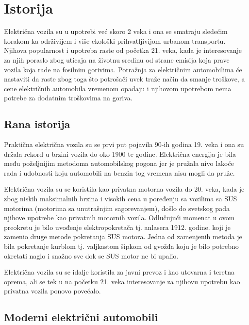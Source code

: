 \documentclass[a4paper]{article}
\begin{document}
\section{Istorija}
\label{sec:naslov1}


Električna vozila su u upotrebi već skoro 2 veka i ona se smatraju sledećim korakom ka održivijem i više ekološki prihvatljivijom urbanom transportu. Njihova popularnost i upotreba raste od početka 21. veka, kada je interesovanje za njih poraslo zbog uticaja na životnu sredinu od strane emisija koja prave vozila koja rade na fosilnim gorivima. Potražnja za električnim automobilima će nastaviti da raste zbog toga što potrošači uvek traže način da smanje troškove, a cene električnih automobila vremenom opadaju i njihovom upotrebom nema potrebe za dodatnim troškovima na goriva.


\subsection{Rana istorija}
\label{subsec:podnaslov1}

Praktična električna vozila su se prvi put pojavila 90-ih godina 19. veka i ona su držala rekord u brzini vozila do oko 1900-te godine. Električna energija je bila među poželjnijim metodoma automobilskog pogona jer je pružala nivo lakoće rada i udobnosti koju automobili na benzin tog vremena nisu mogli da pruže.

Električna vozila su se koristila kao privatna motorna vozila do 20. veka, kada je zbog niskih maksimalnih brzina i visokih cena u poređenju sa vozilima sa SUS motorima (motorima sa unutrašnjim sagorevanjem), došlo do svetskog pada njihove upotrebe kao privatnih motornih vozila. Odlučujući momenat u ovom preokretu je bilo uvođenje elektropokretača tj. anlasera 1912. godine. koji je zamenio druge metode pokretanja SUS motora. Jedna od zamenjenih metoda je bila pokretanje kurblom tj. valjkastom šipkom od gvožđa koju je bilo potrebno okretati naglo i snažno sve dok se SUS motor ne bi upalio.

Električna vozila su se idalje koristila za javni prevoz i kao utovarna i teretna oprema, ali se tek u na početku 21. veka interesovanje za njihovu upotrebu kao privatna vozila ponovo povećalo.


\subsection{Moderni električni automobili}
\label{subsec:podnaslov2}
\end{document}

